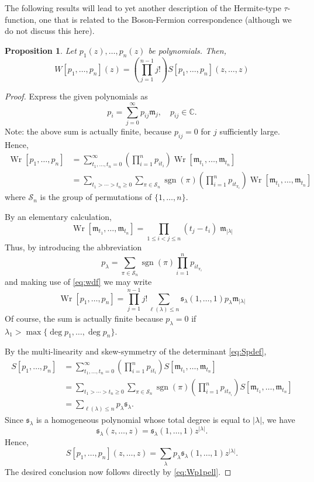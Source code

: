 \documentclass{amsart}
\newtheorem{proposition}{Proposition}
\theoremstyle{definition}
\DeclareMathOperator{\sgn}{\operatorname{sgn}}
\newcommand{\Wr}{\operatorname{Wr}}
\newcommand{\C}{\mathbb{C}}
\newcommand{\fm}{\mathfrak{m}}
\newcommand{\fs}{\mathfrak{s}}
\newcommand{\cS}{\mathcal{S}}
\begin{document}
The following results will lead to yet another description of the
Hermite-type $\tau$-function, one that is related to the Boson-Fermion
correspondence \cite{grandati2014schur} (although we do not discuss
this here).
\begin{proposition}
  Let $p_1(z),\ldots, p_n(z)$ be polynomials. Then,
  \begin{equation}
    W[p_1,\ldots, p_n](z) = \left(\prod_{j=1}^{n-1} j!\right)
    S[p_1,\ldots,p_n](z,\ldots, z)
  \end{equation}
\end{proposition}
\begin{proof}
  Express the given
  polynomials as
  \[ p_i = \sum_{j=0}^{\infty} p_{ij} \fm_j,\quad p_{ij} \in
    \C. \] Note: the above sum is actually finite, because $p_{ij} =0$
  for $j$ sufficiently large.  Hence,
  \begin{align*}
    \Wr[p_1,\ldots,p_n]
    &=\sum_{t_1,\ldots, t_n = 0}^\infty \left(\prod_{i=1}^n p_{it_i}\right)
      \Wr[\fm_{t_1} ,\ldots, \fm_{t_n}]\\
    &= \sum_{t_1>\cdots > t_n\ge0} \sum_{\pi\in \cS_n}
     \sgn(\pi) \left(\prod_{i=1}^n p_{it_{\pi_i}}\right)
            \Wr[\fm_{t_1} ,\ldots, \fm_{t_n}]
  \end{align*}
  where $\cS_n$ is the group of permutations of $\{ 1,\ldots, n\}$.

  By an elementary calculation,
  \[\Wr[\fm_{t_1} ,\ldots,    \fm_{t_n}] =\prod_{1\leq i<j\leq
      n}\!\!\!\!  (t_j-t_i)\; \fm_{|\lambda|}\] Thus, by
  introducing the abbreviation
  \[ p_\lambda =  \sum_{\pi\in \cS_n}
    \sgn(\pi)\prod_{i=1}^n  
    p_{it_{\pi_i}} \] and making use of \eqref{eq:wdf} we may write
  \begin{equation}
    \label{eq:Wp1pell}
    \Wr[p_1,\ldots, p_n] = \prod_{j=1}^{n-1} j! \sum_{\ell(\lambda)\le n}
    \fs_\lambda(1,\ldots, 1 )p_\lambda \fm_{|\lambda|} 
  \end{equation}
  Of course, the sum is actually finite because $p_\lambda=0$ if
  $\lambda_1 > \max \{ \deg p_1,\ldots, \deg p_n\}$.


  By the multi-linearity and skew-symmetry of the determinant
  \eqref{eq:Spdef},
  \begin{align*}
    S[p_1,\ldots, p_n]
    &= \sum_{t_1,\ldots, t_n=0}^\infty 
      \left(\prod_{i=1}^n p_{it_i}\right)  S[\fm_{t_1},\ldots,
      \fm_{t_n}]\\
    &= \sum_{t_1>\cdots > t_n\ge0} \sum_{\pi\in \cS_n}
     \sgn(\pi) \left(\prod_{i=1}^n p_{it_{\pi_i}}\right)S[\fm_{t_1},\ldots,
      \fm_{t_n}] \\
    &= \sum_{\ell(\lambda)\leq n} p_\lambda \fs_\lambda.
  \end{align*}
  Since $\fs_\lambda$ is a homogeneous polynomial whose total degree is
  equal to $|\lambda|$, we have
  \begin{equation}
    \fs_\lambda(z,\ldots, z) =   \fs_\lambda(1,\ldots, 1) z^{|\lambda|}.
  \end{equation}
  Hence,
  \[ S[p_1,\ldots, p_n](z,\ldots, z) = \sum_\lambda p_\lambda
    \fs_\lambda(1,\ldots, 1) z^{|\lambda|}.\]
  The desired
  conclusion now follows directly by \eqref{eq:Wp1pell}.
\end{proof}
\end{document}
